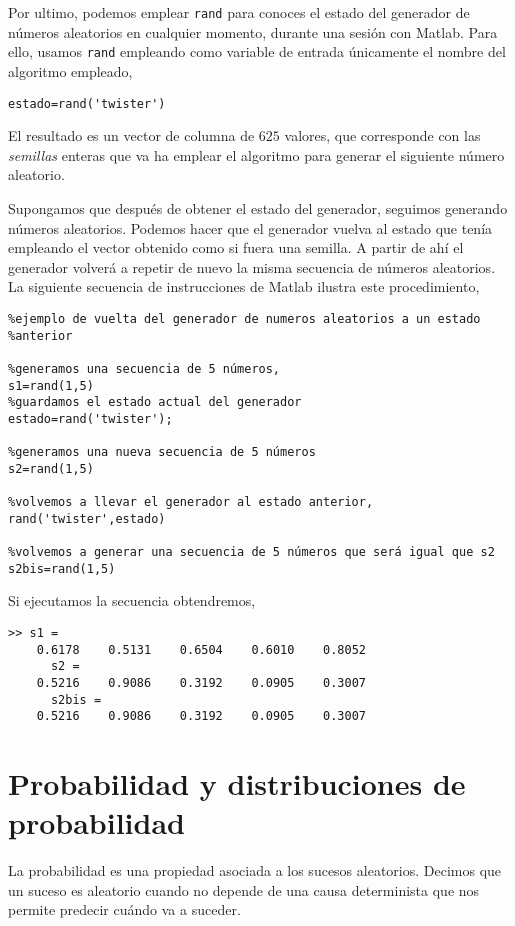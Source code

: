 Por ultimo, podemos emplear \texttt{rand} para conoces el estado del generador de números aleatorios en cualquier momento, durante una sesión con Matlab. Para ello, usamos \texttt{rand} empleando como variable de entrada únicamente el nombre del algoritmo empleado,
\begin{verbatim}
estado=rand('twister')
\end{verbatim}
El resultado es un vector de columna de $625$ valores, que corresponde con las \emph{semillas} enteras que va ha emplear el algoritmo para generar el siguiente número aleatorio. 

Supongamos que después de obtener el estado del generador, seguimos generando números aleatorios. Podemos hacer que el generador vuelva al estado que tenía empleando el vector obtenido como si fuera una semilla. A partir de ahí el generador volverá a repetir de nuevo la misma secuencia de números aleatorios. La siguiente secuencia de instrucciones de Matlab ilustra este procedimiento,
\begin{verbatim}
%ejemplo de vuelta del generador de numeros aleatorios a un estado
%anterior

%generamos una secuencia de 5 números,
s1=rand(1,5)
%guardamos el estado actual del generador
estado=rand('twister');

%generamos una nueva secuencia de 5 números
s2=rand(1,5)

%volvemos a llevar el generador al estado anterior,
rand('twister',estado)

%volvemos a generar una secuencia de 5 números que será igual que s2
s2bis=rand(1,5)
\end{verbatim}

Si ejecutamos la secuencia obtendremos,

\begin{verbatim}
>> s1 =
    0.6178    0.5131    0.6504    0.6010    0.8052
      s2 =
    0.5216    0.9086    0.3192    0.0905    0.3007
      s2bis =
    0.5216    0.9086    0.3192    0.0905    0.3007
\end{verbatim}

\section{Probabilidad y distribuciones de probabilidad}

La probabilidad es una propiedad asociada a los sucesos aleatorios. Decimos que un suceso es aleatorio cuando no depende de una causa determinista que nos permite predecir cuándo va a suceder. 

